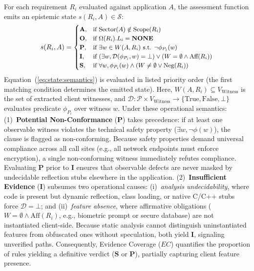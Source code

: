 For each requirement $R_i$ evaluated against application $A$, the assessment function emits an epistemic state $s(R_i, A) \in \mathcal{S}$:
\begin{equation}
\label{eq:state:semantics}
\small
s(R_i, A) = \begin{cases}
\mathbf{A}, & \text{if } \text{Sector}(A) \notin \text{Scope}(R_i) \\
\mathbf{O}, & \text{if } \Omega(R_i).L_i = \mathbf{NONE} \\
\mathbf{P}, & \text{if } \exists w \in W(A, R_i) \text{ s.t. } \neg \phi_{P_i}(w) \\
\mathbf{I}, & \text{if } (\exists w, \mathcal{D}(\phi_{P_i}, w) = \bot) \vee (W = \emptyset \wedge \text{Aff}(R_i)) \\
\mathbf{S}, & \text{if } \forall w, \phi_{P_i}(w) \wedge (W \neq \emptyset \vee \text{Neg}(R_i))
\end{cases}
\end{equation}
Equation~(\ref{eq:state:semantics}) is evaluated in listed priority order (the first matching condition determines the emitted state). Here, $W(A, R_i) \subseteq V_{\text{Witness}}$ is the set of extracted client witnesses, and $\mathcal{D}: \mathcal{P} \times V_{\text{Witness}} \rightarrow \{\text{True}, \text{False}, \bot\}$ evaluates predicate $\phi_{P_i}$ over witness $w$. Under these operational semantics:
(1)~\textbf{Potential Non-Conformance} ($\mathbf{P}$) takes precedence: if at least one observable witness violates the technical safety property ($\exists w, \neg \phi(w)$), the clause is flagged as non-conforming. Because safety properties demand universal compliance across all call sites (e.g., all network endpoints must enforce encryption), a single non-conforming witness immediately refutes compliance. Evaluating $\mathbf{P}$ prior to $\mathbf{I}$ ensures that observable defects are never masked by undecidable reflection stubs elsewhere in the application.
(2)~\textbf{Insufficient Evidence} ($\mathbf{I}$) subsumes two operational causes: (i)~\textit{analysis undecidability}, where code is present but dynamic reflection, class loading, or native C/C++ stubs~\cite{octeau_reflection, ernst_static_dynamic} force $\mathcal{D} = \bot$; and (ii)~\textit{feature absence}, where affirmative obligations ($W = \emptyset \wedge \text{Aff}(R_i)$, e.g., biometric prompt or secure database) are not instantiated client-side. Because static analysis cannot distinguish uninstantiated features from obfuscated ones without speculation, both yield $\mathbf{I}$, signaling unverified paths. Consequently, Evidence Coverage ($EC$) quantifies the proportion of rules yielding a definitive verdict ($\mathbf{S}$ or $\mathbf{P}$), partially capturing client feature presence.
